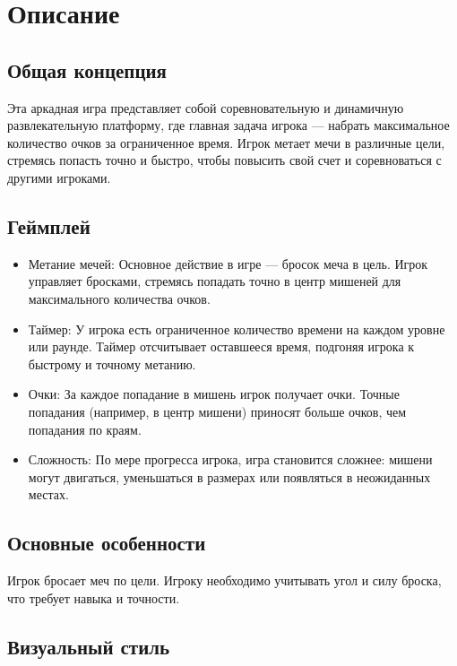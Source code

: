 \section{Описание}

\subsection{Общая концепция}

Эта аркадная игра представляет собой соревновательную и динамичную развлекательную платформу, где главная задача
игрока — набрать максимальное количество очков за ограниченное время.
Игрок метает мечи в различные цели, стремясь попасть точно и быстро, чтобы повысить свой счет и соревноваться с другими
игроками.

\subsection{Геймплей}

\begin{itemize}
	\item Метание мечей: Основное действие в игре — бросок меча в цель. Игрок управляет бросками, стремясь попадать точно в центр мишеней для максимального количества очков.
	\item Таймер: У игрока есть ограниченное количество времени на каждом уровне или раунде. Таймер отсчитывает оставшееся время, подгоняя игрока к быстрому и точному метанию.
	\item Очки: За каждое попадание в мишень игрок получает очки. Точные попадания (например, в центр мишени) приносят больше очков, чем попадания по краям.
	\item Сложность: По мере прогресса игрока, игра становится сложнее: мишени могут двигаться, уменьшаться в размерах или появляться в неожиданных местах.
\end{itemize}

\subsection{Основные особенности}
Игрок бросает меч по цели.
Игроку необходимо учитывать угол и силу броска, что требует навыка и точности.

\subsection{Визуальный стиль}


